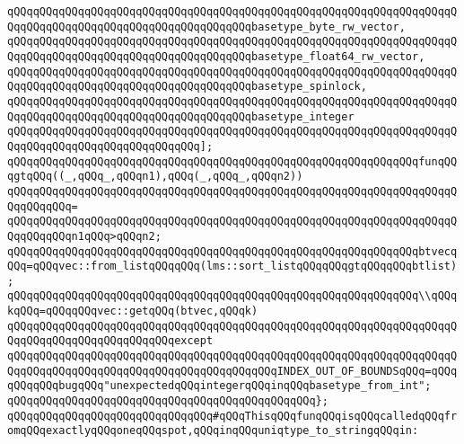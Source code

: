 \verb|qQQqqQQqqQQqqQQqqQQqqQQqqQQqqQQqqQQqqQQqqQQqqQQqqQQqqQQqqQQqqQQqqQQqqQQqqQQqqQQqqQQqqQQqqQQqqQQqqQQqqQQqqQQqbasetype_byte_rw_vector,|\newline
\verb|qQQqqQQqqQQqqQQqqQQqqQQqqQQqqQQqqQQqqQQqqQQqqQQqqQQqqQQqqQQqqQQqqQQqqQQqqQQqqQQqqQQqqQQqqQQqqQQqqQQqqQQqqQQqbasetype_float64_rw_vector,|\newline
\verb|qQQqqQQqqQQqqQQqqQQqqQQqqQQqqQQqqQQqqQQqqQQqqQQqqQQqqQQqqQQqqQQqqQQqqQQqqQQqqQQqqQQqqQQqqQQqqQQqqQQqqQQqqQQqbasetype_spinlock,|\newline
\verb|qQQqqQQqqQQqqQQqqQQqqQQqqQQqqQQqqQQqqQQqqQQqqQQqqQQqqQQqqQQqqQQqqQQqqQQqqQQqqQQqqQQqqQQqqQQqqQQqqQQqqQQqqQQqbasetype_integer|\newline
\verb|qQQqqQQqqQQqqQQqqQQqqQQqqQQqqQQqqQQqqQQqqQQqqQQqqQQqqQQqqQQqqQQqqQQqqQQqqQQqqQQqqQQqqQQqqQQqqQQqqQQq];|\newline
\newline
\verb|qQQqqQQqqQQqqQQqqQQqqQQqqQQqqQQqqQQqqQQqqQQqqQQqqQQqqQQqqQQqqQQqfunqQQqgtqQQq((_,qQQq_,qQQqn1),qQQq(_,qQQq_,qQQqn2))|\newline
\verb|qQQqqQQqqQQqqQQqqQQqqQQqqQQqqQQqqQQqqQQqqQQqqQQqqQQqqQQqqQQqqQQqqQQqqQQqqQQqqQQq=|\newline
\verb|qQQqqQQqqQQqqQQqqQQqqQQqqQQqqQQqqQQqqQQqqQQqqQQqqQQqqQQqqQQqqQQqqQQqqQQqqQQqqQQqn1qQQq>qQQqn2;|\newline
\newline
\verb|qQQqqQQqqQQqqQQqqQQqqQQqqQQqqQQqqQQqqQQqqQQqqQQqqQQqqQQqqQQqqQQqbtvecqQQq=qQQqvec::from_listqQQqqQQq(lms::sort_listqQQqqQQqgtqQQqqQQqbtlist);|\newline
\newline
\verb|qQQqqQQqqQQqqQQqqQQqqQQqqQQqqQQqqQQqqQQqqQQqqQQqqQQqqQQqqQQqqQQq\\qQQqkqQQq=qQQqqQQqvec::getqQQq(btvec,qQQqk)|\newline
\verb|qQQqqQQqqQQqqQQqqQQqqQQqqQQqqQQqqQQqqQQqqQQqqQQqqQQqqQQqqQQqqQQqqQQqqQQqqQQqqQQqqQQqqQQqqQQqqQQqexcept|\newline
\verb|qQQqqQQqqQQqqQQqqQQqqQQqqQQqqQQqqQQqqQQqqQQqqQQqqQQqqQQqqQQqqQQqqQQqqQQqqQQqqQQqqQQqqQQqqQQqqQQqqQQqqQQqqQQqqQQqINDEX_OUT_OF_BOUNDSqQQq=qQQqqQQqqQQqbugqQQq"unexpectedqQQqintegerqQQqinqQQqbasetype_from_int";|\newline
\verb|qQQqqQQqqQQqqQQqqQQqqQQqqQQqqQQqqQQqqQQqqQQqqQQq};|\newline
\newline
\newline
\newline
\verb|qQQqqQQqqQQqqQQqqQQqqQQqqQQqqQQq#qQQqThisqQQqfunqQQqisqQQqcalledqQQqfromqQQqexactlyqQQqoneqQQqspot,qQQqinqQQquniqtype_to_stringqQQqin:|\newline
